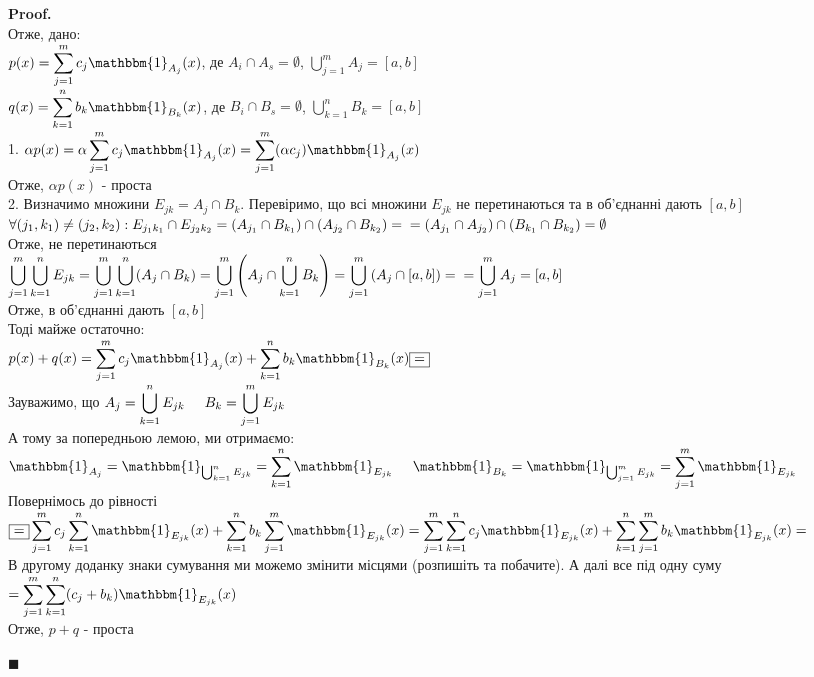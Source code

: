 \documentclass[a4paper, 14pt]{extarticle}
\def\huge{\displaystyle}
\def\bigline{\vspace{5mm}\\}
\theoremstyle{theoremdd}
\theoremstyle{theoremdd}
\theoremstyle{theoremdd}
\theoremstyle{theoremdd}
\theoremstyle{theoremdd}
\theoremstyle{theoremdd}
\theoremstyle{theoremdd}
\theoremstyle{theoremdd}
\newenvironment{pf}{\vspace*{-3mm} \textbf{Proof. \\}}{$\blacksquare$}
\begin{document}
\begin{pf}
Отже, дано:\\
$p(x) = \huge \sum_{j=1}^m c_j \mathbbm{1}_{A_j}(x)$, де $A_i \cap A_s = \emptyset$, $\huge \bigcup_{j=1}^m A_j = [a,b]$\\
$q(x) = \huge \sum_{k=1}^n b_k \mathbbm{1}_{B_k}(x)$, де $B_i \cap B_s = \emptyset$, $\huge \bigcup_{k=1}^n B_k = [a,b]$
\bigline
1. $\alpha p(x) = \alpha \huge \sum_{j=1}^m c_j \mathbbm{1}_{A_j}(x) = \huge \sum_{j=1}^m (\alpha c_j) \mathbbm{1}_{A_j}(x)$\\
Отже, $\alpha p(x)$ - проста
\bigline
2. Визначимо множини $E_{jk} = A_j \cap B_k$. Перевіримо, що всі множини $E_{jk}$ не перетинаються та в об'єднанні дають $[a,b]$\\
$\forall (j_1,k_1) \neq (j_2, k_2): E_{j_1 k_1} \cap E_{j_2 k_2} = (A_{j_1} \cap B_{k_1}) \cap (A_{j_2} \cap B_{k_2}) = \\ = (A_{j_1} \cap A_{j_2}) \cap (B_{k_1} \cap B_{k_2}) = \emptyset$\\
Отже, не перетинаються\\
\bigskip
$\huge \bigcup _{j=1}^m \bigcup _{k=1}^n E_{jk} =\bigcup _{j=1}^m \bigcup _{k=1}^n (A_j \cap B_k) = \bigcup_{j=1}^m  \left( A_j \cap \bigcup_{k=1}^n B_k \right) = \bigcup_{j=1}^m \left( A_j \cap [a,b] \right) = \\ = \bigcup_{j=1}^m A_j = [a,b]$\\
Отже, в об'єднанні дають $[a,b]$\\
Тоді майже остаточно:\\
$p(x) + q(x) = \huge \sum_{j=1}^m c_j \mathbbm{1}_{A_j}(x) + \sum_{k=1}^n b_k \mathbbm{1}_{B_k}(x) \boxed{=}$\\
Зауважимо, що $\huge A_j = \bigcup_{k=1}^n E_{jk} \hspace{0.5cm} B_k = \bigcup_{j=1}^m E_{jk}$\\
А тому за попередньою лемою, ми отримаємо:\\
$\mathbbm{1}_{A_{j}} = \mathbbm{1}_{\bigcup_{k=1}^n E_{jk}} = \huge \sum_{k=1}^n \mathbbm{1}_{E_{jk}} \hspace{0.5cm}
\mathbbm{1}_{B_{k}} = \mathbbm{1}_{\bigcup_{j=1}^m E_{jk}} = \huge \sum_{j=1}^m \mathbbm{1}_{E_{jk}}$\\
Повернімось до рівності\\
$\boxed{=} \huge \sum_{j=1}^m c_j \sum_{k=1}^n \mathbbm{1}_{E_{jk}}(x) + \huge \sum_{k=1}^n b_k \sum_{j=1}^m \mathbbm{1}_{E_{jk}}(x) = \huge \sum_{j=1}^m \sum_{k=1}^n c_j \mathbbm{1}_{E_{jk}}(x) + \huge \sum_{k=1}^n \sum_{j=1}^m b_k \mathbbm{1}_{E_{jk}}(x) =$\\
В другому доданку знаки сумування ми можемо змінити місцями (розпишіть та побачите). А далі все під одну суму\\
$= \huge \sum_{j=1}^m \sum_{k=1}^n (c_j+b_k) \mathbbm{1}_{E_{jk}}(x)$\\
Отже, $p+q$ - проста
\begin{figure}[H]
\centering
{}
\end{figure}
\end{pf}
\end{document}
